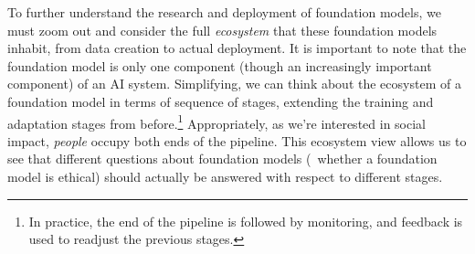 To further understand the research and deployment of foundation models,
we must zoom out and consider the full \emph{ecosystem} that these foundation models inhabit,
from data creation to actual deployment.
It is important to note that the foundation model is only one component (though
an increasingly important component) of an AI system.
Simplifying, we can think about the ecosystem of a foundation model in terms of
sequence of stages, extending the training and adaptation stages from before.\footnote{In practice, the end of the pipeline is followed by monitoring, and feedback is
used to readjust the previous stages.}
Appropriately, as we're interested in social impact,
\emph{people} occupy both ends of the pipeline.
This ecosystem view allows us to see that different questions about foundation models
(\eg~whether a foundation model is ethical) should actually be answered with respect to different stages.
